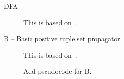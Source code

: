 \documentclass[a4paper,11pt]{article}
\newcommand{\Todo}[1]{{\color{blue}#1}}
\newcommand{\Algoref}[1]{Algorithm~\ref{#1}}
\newcommand{\Extensional}{\Constraint{Extensional}~}
\newcommand{\FOREACH}[1]{\FORALL{{#1} \textbf{do}}}
\newcommand{\ENDFOREACH}{\ENDFOR}
\def\PROCEDURE{\item[\textbf{PROCEDURE}]}
\def\bool{\mathit{bool}}
\def\Extensional{\textsc{Extensional}}
\numberwithin{equation}{section}
\begin{document}
\begin{description}
  \item[DFA] This is based on~\cite{Pesant:seqs}.
  \item[B -- Basic positive tuple set propagator]
    This is based on~\cite{DBLP:journals/ai/BessiereRYZ05}.

    \Todo{Add pseudocode for B}.






\end{description}
\end{document}
